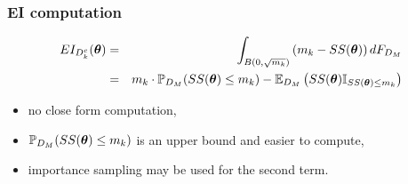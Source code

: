 \documentclass[nopagenumber,9pt]{beamer}
\begin{document}
\begin{frame}
 \frametitle{EI computation}
 
 
 \begin{eqnarray*}
  EI_{D^c_k}(\boldsymbol{\theta})&=&\int_{B(0,\sqrt{m_k})}\left(m_k-SS(\boldsymbol{\theta})\right)dF_{D_M}\\
  &=&m_k\cdot \mathbb{P}_{D_M}(SS(\boldsymbol{\theta})\le m_k)-\mathbb{E}_{D_M}\left(SS(\boldsymbol{\theta})\mathbb{I}_{SS(\boldsymbol{\theta})\le m_k}\right)
 \end{eqnarray*}

 
 \bigskip
 \begin{itemize}
  \item no close form computation,
  \item $\mathbb{P}_{D_M}(SS(\boldsymbol{\theta})\le m_k)$ is an upper bound and easier to compute,
  \item importance sampling may be used for the second term.
 \end{itemize}
 
\end{frame}
\end{document}

